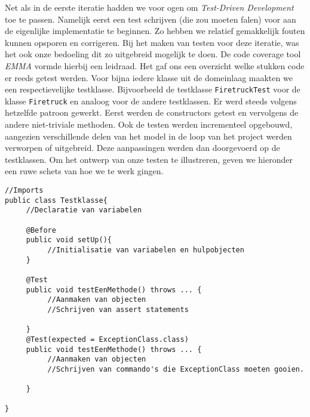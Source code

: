 \label{testen}
Net als in de eerste iteratie hadden we voor ogen om \textit{Test-Driven Development} toe te passen.
Namelijk eerst een test schrijven (die zou moeten falen) voor aan de eigenlijke implementatie te beginnen.
Zo hebben we relatief gemakkelijk fouten kunnen opsporen en corrigeren.
Bij het maken van testen voor deze iteratie, was het ook onze bedoeling dit zo uitgebreid mogelijk te doen.
De code coverage tool \textit{EMMA} vormde hierbij een leidraad. Het gaf ons een overzicht welke stukken code er reeds getest werden.
Voor bijna iedere klasse uit de domeinlaag maakten we een respectievelijke testklasse.
Bijvoorbeeld de testklasse \texttt{FiretruckTest} voor de klasse \texttt{Firetruck} en analoog voor de andere testklassen.
Er werd steeds volgens hetzelfde patroon gewerkt. Eerst werden de constructors getest en vervolgens de andere niet-triviale methoden.
Ook de testen werden incrementeel opgebouwd, aangezien verschillende delen van het model in de loop van het project werden verworpen of uitgebreid.
Deze aanpassingen werden dan doorgevoerd op de testklassen.
Om het ontwerp van onze testen te illustreren, geven we hieronder een ruwe schets van hoe we te werk gingen.
\begin{lstlisting}
//Imports
public class Testklasse{
     //Declaratie van variabelen

     @Before
     public void setUp(){
          //Initialisatie van variabelen en hulpobjecten
     }

     @Test
     public void testEenMethode() throws ... {
          //Aanmaken van objecten
          //Schrijven van assert statements

     }
     @Test(expected = ExceptionClass.class)
     public void testEenMethode() throws ... {
          //Aanmaken van objecten
          //Schrijven van commando's die ExceptionClass moeten gooien.

     }

}
\end{lstlisting}
